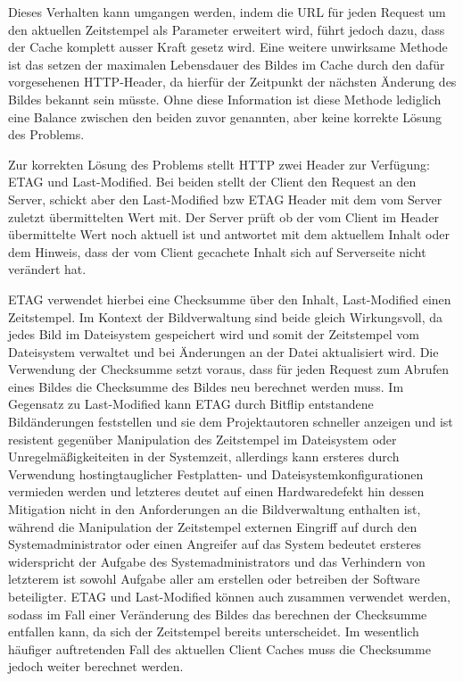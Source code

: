 Dieses Verhalten kann umgangen werden, indem die URL für jeden Request um den
aktuellen Zeitstempel als Parameter erweitert wird, führt jedoch dazu, dass der
Cache komplett ausser Kraft gesetz wird. Eine weitere unwirksame Methode ist das
setzen der maximalen Lebensdauer des Bildes im Cache durch den dafür
vorgesehenen HTTP-Header, da hierfür der Zeitpunkt der nächsten Änderung des
Bildes bekannt sein müsste. Ohne diese Information ist diese Methode lediglich
eine Balance zwischen den beiden zuvor genannten, aber keine korrekte Lösung des
Problems.

Zur korrekten Lösung des Problems stellt HTTP zwei Header zur Verfügung: ETAG
und Last-Modified. Bei beiden stellt der Client den Request an den Server,
schickt aber den Last-Modified bzw ETAG Header mit dem vom Server zuletzt
übermittelten Wert mit. Der Server prüft ob der vom Client im Header
übermittelte Wert noch aktuell ist und antwortet mit dem aktuellem Inhalt oder
dem Hinweis, dass der vom Client gecachete Inhalt sich auf Serverseite nicht
verändert hat.

ETAG verwendet hierbei eine Checksumme über den Inhalt, Last-Modified einen
Zeitstempel. Im Kontext der Bildverwaltung sind beide gleich Wirkungsvoll, da
jedes Bild im Dateisystem gespeichert wird und somit der Zeitstempel vom
Dateisystem verwaltet und bei Änderungen an der Datei aktualisiert wird. Die
Verwendung der Checksumme setzt voraus, dass für jeden Request zum Abrufen eines
Bildes die Checksumme des Bildes neu berechnet werden muss. Im Gegensatz zu
Last-Modified kann ETAG durch Bitflip entstandene Bildänderungen feststellen und
sie dem Projektautoren schneller anzeigen und ist resistent gegenüber
Manipulation des Zeitstempel im Dateisystem oder Unregelmäßigkeiteiten in der
Systemzeit, allerdings kann ersteres durch Verwendung hostingtauglicher
Festplatten- und Dateisystemkonfigurationen vermieden werden und letzteres
deutet auf einen Hardwaredefekt hin dessen Mitigation nicht in den Anforderungen
an die Bildverwaltung enthalten ist, während die Manipulation der Zeitstempel
externen Eingriff auf durch den Systemadministrator oder einen Angreifer auf das
System bedeutet ersteres widerspricht der Aufgabe des Systemadministrators und
das Verhindern von letzterem ist sowohl Aufgabe aller am erstellen oder
betreiben der Software beteiligter. ETAG und Last-Modified können auch zusammen
verwendet werden, sodass im Fall einer Veränderung des Bildes das berechnen der
Checksumme entfallen kann, da sich der Zeitstempel bereits unterscheidet. Im
wesentlich häufiger auftretenden Fall des aktuellen Client Caches muss die
Checksumme jedoch weiter berechnet werden.

